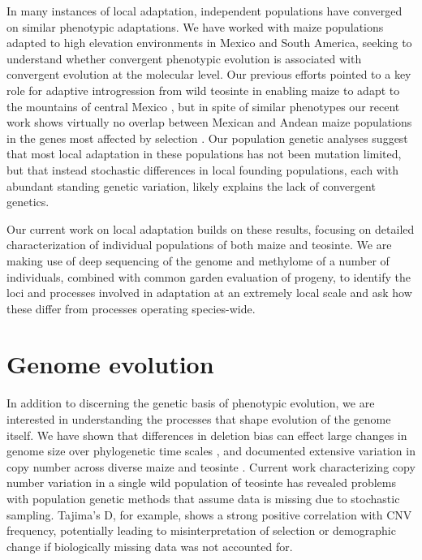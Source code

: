 \documentclass[11pt,letterpaper]{article}
\begin{document}
In many instances of local adaptation, independent populations have converged on similar phenotypic adaptations.  
We have worked with maize populations adapted to high elevation environments in Mexico and South America, seeking to understand whether convergent phenotypic evolution is associated with convergent evolution at the molecular level.
Our previous efforts pointed to a key role for adaptive introgression from wild teosinte in enabling maize to adapt to the mountains of central Mexico \citep{hufford2013genomic}, but in spite of similar phenotypes our recent work shows virtually no overlap between Mexican and Andean maize populations in the genes most affected by selection \citep{Takuno15062015}.
Our population genetic analyses suggest that most local adaptation in these populations has not been mutation limited, but that instead stochastic differences in local founding populations, each with abundant standing genetic variation, likely explains the lack of convergent genetics.

Our current work on local adaptation builds on these results, focusing on detailed characterization of individual populations of both maize and teosinte. 
We are making use of deep sequencing of the genome and methylome of a number of individuals, combined  with common garden evaluation of progeny, to identify the loci and processes involved in adaptation at an extremely local scale and ask how these differ from processes operating species-wide.


\section*{Genome evolution} %

In addition to discerning the genetic basis of phenotypic evolution, we are interested in  understanding the processes that shape evolution of the genome itself.
We have shown that differences in deletion bias can effect large changes in genome size over phylogenetic time scales \citep{tenaillon2011genome}, and documented extensive variation in copy number across diverse maize and teosinte \citep{gore2009first, chia2012maize}.
Current work characterizing copy number variation in a single wild population of teosinte has revealed problems with population genetic methods that assume data is missing due to stochastic sampling.
Tajima's D, for example, shows a strong positive correlation with CNV frequency, potentially leading to misinterpretation of selection or demographic change if biologically missing data was not accounted for.
\end{document}
